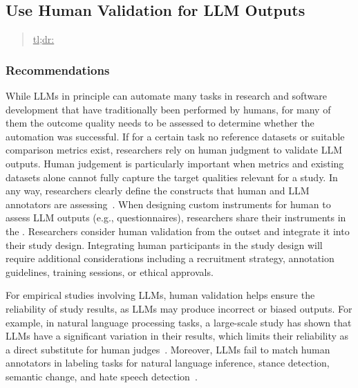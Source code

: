 



\subsection{Use Human Validation for LLM Outputs}
\label{sec:use-human-validation-for-llm-outputs}

\begin{quote}
\underline{tl;dr:} 
\end{quote}

\subsubsection{Recommendations}

While LLMs in principle can automate many tasks in research and software development that have traditionally been performed by humans, for many of them the outcome quality needs to be assessed to determine whether the automation was successful.
If for a certain task no reference datasets or suitable comparison metrics exist, researchers \should rely on human judgment to validate LLM outputs.
Human judgement is particularly important when metrics and existing datasets alone cannot fully capture the target qualities relevant for a study.
In any way, researchers \must clearly define the constructs that human and LLM annotators are assessing~\cite{DBLP:conf/ease/RalphT18}.
When designing custom instruments for human to assess LLM outputs (e.g., questionnaires), researchers \should share their instruments in the \supplementarymaterial.
Researchers \should consider human validation from the outset and integrate it into their study design.
Integrating human participants in the study design will require additional considerations including a recruitment strategy, annotation guidelines, training sessions, or ethical approvals.

For empirical studies involving LLMs, human validation helps ensure the reliability of study results, as LLMs may produce incorrect or biased outputs.
For example, in natural language processing tasks, a large-scale study has shown that LLMs have a significant variation in their results, which limits their reliability as a direct substitute for human judges~\cite{DBLP:journals/corr/abs-2406-18403}. 
Moreover, LLMs fail to match human annotators in labeling tasks for natural language inference, stance detection, semantic change, and hate speech detection~\cite{DBLP:conf/chi/Wang0RMM24}.


